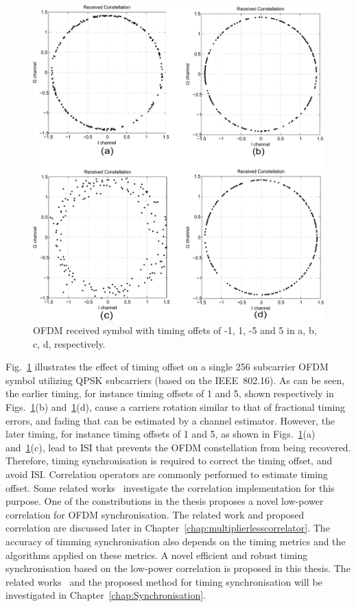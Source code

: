 \begin{figure}
	\centerline{\includegraphics [width=0.8\columnwidth] {Figures/timeoff.pdf} }
	\caption{OFDM received symbol with timing offets of -1, 1, -5 and 5 in a, b, c, d, respectively.}
	\label{fig:Timingoffsetconstellation}
\end{figure}

Fig.~\ref{fig:Timingoffsetconstellation} illustrates the effect of timing offset on a single 256 subcarrier OFDM symbol utilizing QPSK subcarriers (based on the IEEE~802.16).
As can be seen, the earlier timing, for instance timing offsets of 1 and 5, shown respectively in Figs.~\ref{fig:Timingoffsetconstellation}(b) and~\ref{fig:Timingoffsetconstellation}(d), cause a carriers rotation similar to that of fractional timing errors, and fading that can be estimated by a channel estimator.
However, the later timing, for instance timing offsets of 1 and 5, as shown in Figs.~\ref{fig:Timingoffsetconstellation}(a) and~\ref{fig:Timingoffsetconstellation}(c), lead to ISI that prevents the OFDM constellation from being recovered.
Therefore, timing synchronisation is required to correct the timing offset, and avoid ISI.
Correlation operators are commonly performed to estimate timing offset. Some related works~\cite{Dick2003,Fort2003,Wang2004} investigate the correlation implementation for this purpose. One of the constributions in the thesis proposes a novel low-power correlation for OFDM synchronisation. The related work and proposed correlation are discussed later in Chapter~\ref{chap:multiplierlesscorrelator}.
The accuracy of timming synchronisation also depends on the timing metrics and the algorithms applied on these metrics. A novel efficient and robust timing synchronisation based on the low-power correlation is proposed in this thesis. The related works~\cite{Schmidl1997,Kishore2006,Guffey2007,Huang2010,Recio2010} and the proposed method for timing synchronisation will be investigated in Chapter~\ref{chap:Synchronisation}.
